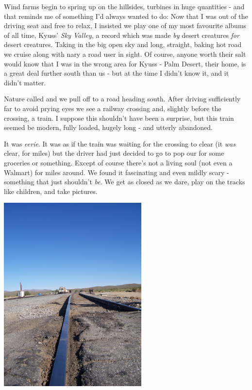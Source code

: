 \documentclass[a5paper,titlepage,11pt,draft]{book}
\begin{document}
Wind farms begin to spring up on the hillsides, turbines in huge quantities - and that reminds me of something I'd always wanted to do:  Now that I was out of the driving seat and free to relax, I insisted we play one of my most favourite albums of all time, Kyuss' \emph{Sky Valley}, a record which was made \emph{by} desert creatures \emph{for} desert creatures.  Taking in the big open sky and long, straight, baking hot road we cruise along with nary a road user in sight.  Of course, anyone worth their salt would know that I was in the wrong area for Kyuss - Palm Desert, their home, is a great deal further south than us - but at the time I didn't know it, and it didn't matter.

Nature called and we pull off to a road heading south.  After driving sufficiently far to avoid prying eyes we see a railway crossing and, slightly before the crossing, a train. I suppose this shouldn't have been a surprise, but this train seemed be modern, fully loaded, hugely long - and utterly abandoned.

It was \emph{eerie}.  It was as if the train was waiting for the crossing to clear (it \emph{was} clear, for miles) but the driver had just decided to go to pop our for some groceries or something.  Except of course there's not a living soul (not even a Walmart) for miles around.  We found it fascinating and even mildly scary - something that just shouldn't \emph{be}.  We get as closed as we dare, play on the tracks like children, and take pictures.

\begin{center}\includegraphics[height=100mm]{gfx/100_1346}\end{center}
\end{document}
